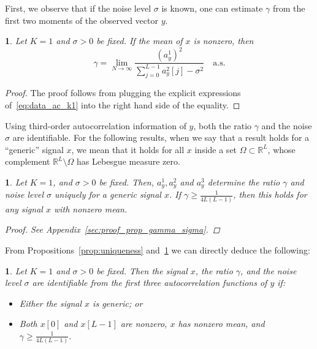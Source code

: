 \documentclass[english,11pt]{article}
\newcommand{\1}{\mathbf{1}}
\numberwithin{equation}{section}
\theoremstyle{plain}
\theoremstyle{definition}
\theoremstyle{remark}
\theoremstyle{plain}
\theoremstyle{remark}
\theoremstyle{plain}
\newtheorem{corollary}[thm]{\protect\corollaryname}
\theoremstyle{plain}
\newtheorem{proposition}[thm]{\protect\propositionname}
\providecommand{\corollaryname}{Corollary}
\providecommand{\propositionname}{Proposition}
\newcommand{\RL}{\mathbb{R}^L}
\begin{document}
First, we observe that if the noise level $\sigma$ is known, one can estimate $\gamma$ from the first two moments of the observed vector $y$.
%
\begin{proposition} \label{prop:gamma}
	Let $K=1$ and $\sigma > 0$ be fixed. If the mean of $x$ is nonzero, then 
	\begin{equation*}
	\gamma = \lim_{N \to \infty}\frac{(a^1_y)^2}{\sum_{j=0}^{L-1}a_y^2[j]-\sigma^2} \quad \text{a.s.}
	\end{equation*}
\end{proposition}
\begin{proof}
	The proof follows from plugging the explicit expressions of~\eqref{eq:data_ac_k1} into the right hand side of the equality.
\end{proof}

Using third-order autocorrelation information of $y$, both the ratio $\gamma$ and the noise $\sigma$ are identifiable. For the following results, when we say that a result holds for a ``generic'' signal $x$, we mean that it holds for all $x$ inside a set $\Omega \subset \RL$, whose complement $\RL \setminus \Omega$ has Lebesgue measure zero.

\begin{proposition} \label{prop:gamma_sigma}
	Let $K=1$, and $\sigma > 0$ be fixed. Then, $a_y^1,a_y^2$ and  $a_y^3$ determine the ratio $\gamma$ and noise level $\sigma$ uniquely for a generic signal $x$. If $\gamma\geq\frac{1}{4L(L-1)}$, then this holds for any signal $x$ with nonzero mean. 
	\begin{proof}
		See Appendix~\ref{sec:proof_prop_gamma_sigma}.
	\end{proof}
\end{proposition}

From Propositions~\ref{prop:uniqueness} and~\ref{prop:gamma_sigma} we can directly deduce the following:
\begin{corollary}
	Let $K=1$ and $\sigma > 0$ be fixed. Then the signal $x$, the ratio $\gamma$, and the noise level $\sigma$ are identifiable from the first three autocorrelation functions of $y$ if:
	\begin{itemize}
		\item Either the signal $x$ is generic; or
		\item  Both $x[0]$  and $x[L-1]$ are nonzero, $x$ has nonzero mean, and $\gamma\geq\frac{1}{4L(L-1)}$.
	\end{itemize}
\end{corollary}
\end{document}
